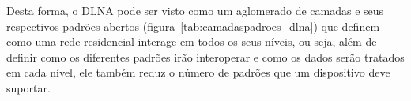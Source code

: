 Desta forma, o DLNA pode ser visto como um aglomerado de camadas e seus respectivos padrões abertos (figura~\ref{tab:camadaspadroes_dlna}) que definem como uma rede residencial interage em todos os seus níveis, ou seja, além de definir como os diferentes padrões irão interoperar e como os dados serão tratados em cada nível, ele também reduz o número de padrões que um dispositivo deve suportar.

